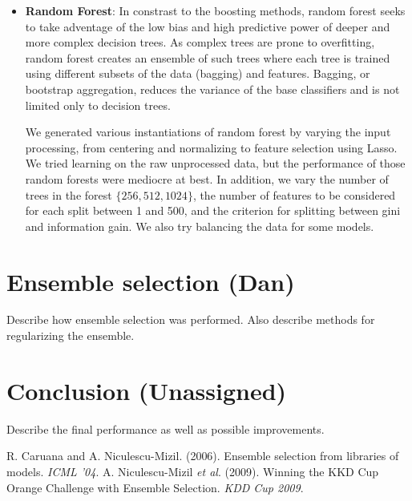 \documentclass{article}
\renewcommand{\(}{\left(}
\renewcommand{\)}{\right)}
\begin{document}
\begin{itemize}
    \item \textbf{Random Forest}: In constrast to the boosting methods, random forest seeks to take adventage of the low bias and high predictive power of deeper and more complex decision trees.  As complex trees are prone to overfitting, random forest creates an ensemble of such trees where each tree is trained using different subsets of the data (bagging) and features. Bagging, or bootstrap aggregation, reduces the variance of the base classifiers and is not limited only to decision trees.    

      We generated various instantiations of random forest by varying the input processing, from centering and normalizing to feature selection using Lasso.  We tried learning on the raw unprocessed data, but the performance of those random forests were mediocre at best.  In addition, we vary the number of trees in the forest $\{256, 512, 1024\}$, the number of features to be considered for each split between 1 and 500, and the criterion for splitting between gini and information gain.  We also try balancing the data for some models.   
  \end{itemize}

\section{Ensemble selection (Dan)}
Describe how ensemble selection was performed. Also describe methods for regularizing the ensemble. 

\section{Conclusion (Unassigned)}
Describe the final performance as well as possible improvements. 

\begin{thebibliography}{99}
  R. Caruana and A. Niculescu-Mizil.
  (2006).
  Ensemble selection from libraries of models.
  \emph{ICML '04}.
  A. Niculescu-Mizil \emph{et al}.
  (2009).
  Winning the KKD Cup Orange Challenge with Ensemble Selection.
  \emph{KDD Cup 2009}.

\end{thebibliography}
\end{document}
